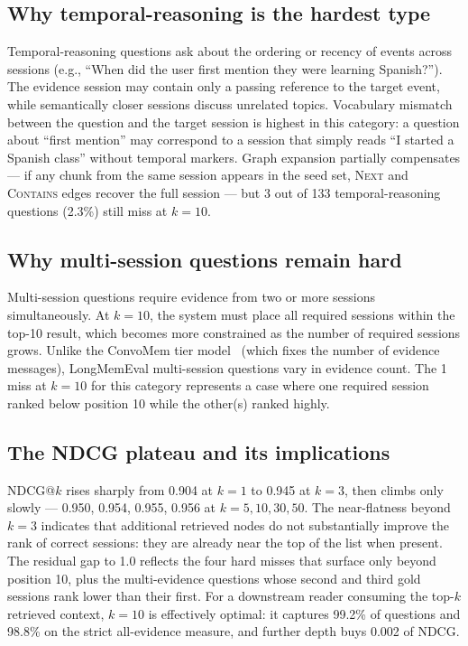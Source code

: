 \documentclass[11pt,a4paper]{article}
\begin{document}
\subsection{Why temporal-reasoning is the hardest type}

Temporal-reasoning questions ask about the ordering or recency of events across
sessions (e.g., ``When did the user first mention they were learning Spanish?'').
The evidence session may contain only a passing reference to the target event,
while semantically closer sessions discuss unrelated topics.
Vocabulary mismatch between the question and the target session is highest in
this category: a question about ``first mention'' may correspond to a session
that simply reads ``I started a Spanish class'' without temporal markers.
Graph expansion partially compensates --- if any chunk from the same session
appears in the seed set, \textsc{Next} and \textsc{Contains} edges recover the
full session --- but 3 out of 133 temporal-reasoning questions (2.3\%) still
miss at $k{=}10$.

\subsection{Why multi-session questions remain hard}

Multi-session questions require evidence from two or more sessions simultaneously.
At $k{=}10$, the system must place all required sessions within the top-10 result,
which becomes more constrained as the number of required sessions grows.
Unlike the ConvoMem tier model~\citep{pakhomov2025convomem}
(which fixes the number of evidence messages),
LongMemEval multi-session questions vary in evidence count.
The 1 miss at $k{=}10$ for this category represents a case where one required
session ranked below position 10 while the other(s) ranked highly.

\subsection{The NDCG plateau and its implications}

NDCG@$k$ rises sharply from 0.904 at $k{=}1$ to 0.945 at $k{=}3$, then climbs
only slowly --- 0.950, 0.954, 0.955, 0.956 at $k{=}5, 10, 30, 50$.
The near-flatness beyond $k{=}3$ indicates that additional retrieved nodes do not
substantially improve the rank of correct sessions: they are already near the top
of the list when present.
The residual gap to 1.0 reflects the four hard misses that surface only beyond
position 10, plus the multi-evidence questions whose second and third gold
sessions rank lower than their first.
For a downstream reader consuming the top-$k$ retrieved context, $k{=}10$ is
effectively optimal: it captures 99.2\% of questions and 98.8\% on the strict
all-evidence measure, and further depth buys 0.002 of NDCG.
\end{document}
